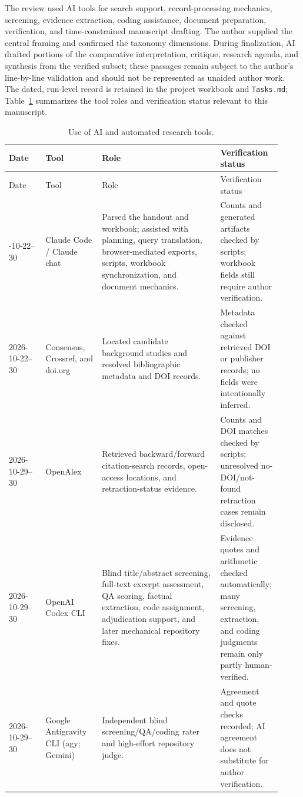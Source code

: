 The review used AI tools for search support, record-processing mechanics, screening, evidence extraction, coding assistance, document preparation, verification, and time-constrained manuscript drafting. The author supplied the central framing and confirmed the taxonomy dimensions. During finalization, AI drafted portions of the comparative interpretation, critique, research agenda, and synthesis from the verified subset; these passages remain subject to the author's line-by-line validation and should not be represented as unaided author work. The dated, run-level record is retained in the project workbook and \texttt{Tasks.md}; Table~\ref{tab:ai-use} summarizes the tool roles and verification status relevant to this manuscript.

\small
\begin{longtable}{@{}p{0.13\linewidth}p{0.20\linewidth}p{0.42\linewidth}p{0.17\linewidth}@{}}
\caption{Use of AI and automated research tools.}\label{tab:ai-use}\\
\hline
Date & Tool & Role & Verification status \\
\hline
\endfirsthead
\hline
Date & Tool & Role & Verification status \\
\hline
\endhead
\hline
\endfoot
2026-10-22--30 & Claude Code / Claude chat & Parsed the handout and workbook; assisted with planning, query translation, browser-mediated exports, scripts, workbook synchronization, and document mechanics. & Counts and generated artifacts checked by scripts; workbook fields still require author verification. \\
2026-10-22--30 & Consensus, Crossref, and doi.org & Located candidate background studies and resolved bibliographic metadata and DOI records. & Metadata checked against retrieved DOI or publisher records; no fields were intentionally inferred. \\
2026-10-29--30 & OpenAlex & Retrieved backward/forward citation-search records, open-access locations, and retraction-status evidence. & Counts and DOI matches checked by scripts; unresolved no-DOI/not-found retraction cases remain disclosed. \\
2026-10-29--30 & OpenAI Codex CLI & Blind title/abstract screening, full-text excerpt assessment, QA scoring, factual extraction, code assignment, adjudication support, and later mechanical repository fixes. & Evidence quotes and arithmetic checked automatically; many screening, extraction, and coding judgments remain only partly human-verified. \\
2026-10-29--30 & Google Antigravity CLI (agy; Gemini) & Independent blind screening/QA/coding rater and high-effort repository judge. & Agreement and quote checks recorded; AI agreement does not substitute for author verification. \\

\end{longtable}
